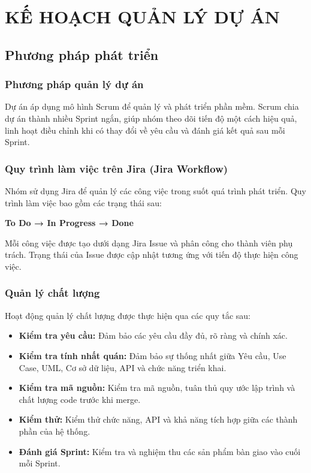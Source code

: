 \chapter{KẾ HOẠCH QUẢN LÝ DỰ ÁN}

\section{Phương pháp phát triển}

\subsection{Phương pháp quản lý dự án}

Dự án áp dụng mô hình Scrum để quản lý và phát triển phần mềm. Scrum chia dự án thành nhiều Sprint ngắn, giúp nhóm theo dõi tiến độ một cách hiệu quả, linh hoạt điều chỉnh khi có thay đổi về yêu cầu và đánh giá kết quả sau mỗi Sprint.

\subsection{Quy trình làm việc trên Jira (Jira Workflow)}

Nhóm sử dụng Jira để quản lý các công việc trong suốt quá trình phát triển. Quy trình làm việc bao gồm các trạng thái sau:

\textbf{To Do → In Progress → Done}

Mỗi công việc được tạo dưới dạng Jira Issue và phân công cho thành viên phụ trách. Trạng thái của Issue được cập nhật tương ứng với tiến độ thực hiện công việc.

\subsection{Quản lý chất lượng}

Hoạt động quản lý chất lượng được thực hiện qua các quy tắc sau:

\begin{itemize}
\item
  \textbf{Kiểm tra yêu cầu:} Đảm bảo các yêu cầu đầy đủ, rõ ràng và chính xác.
\item
  \textbf{Kiểm tra tính nhất quán:} Đảm bảo sự thống nhất giữa Yêu cầu, Use Case, UML, Cơ sở dữ liệu, API và chức năng triển khai.
\item
  \textbf{Kiểm tra mã nguồn:} Kiểm tra mã nguồn, tuân thủ quy ước lập trình và chất lượng code trước khi merge.
\item
  \textbf{Kiểm thử:} Kiểm thử chức năng, API và khả năng tích hợp giữa các thành phần của hệ thống.
\item
  \textbf{Đánh giá Sprint:} Kiểm tra và nghiệm thu các sản phẩm bàn giao vào cuối mỗi Sprint.
\end{itemize}

